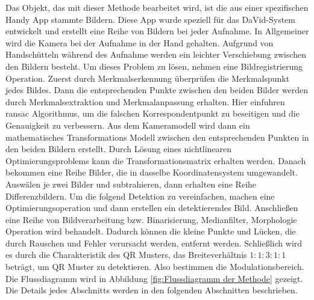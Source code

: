 Das Objekt, das mit dieser Methode bearbeitet wird, ist die aus einer spezifischen Handy App stammte Bildern. Diese App wurde speziell für das DaVid-System entwickelt und erstellt eine Reihe von Bildern bei jeder Aufnahme. In Allgemeiner wird die Kamera bei der Aufnahme in der Hand gehalten. Aufgrund von Handschütteln während des Aufnahme werden ein leichter Verschiebung zwischen den Bildern besteht. Um dieses Problem zu lösen, nehmen eine Bildregistrierung Operation. Zuerst durch Merkmalserkennung überprüfen
die Merkmalspunkt jedes Bildes. Dann die entsprechenden Punkte zwischen den beiden Bilder werden durch Merkmalsextraktion und Merkmalanpassung erhalten. Hier einfuhren \gls{ransac} Algorithmus, um die falschen Korrespondentpunkt zu beseitigen und die Genauigkeit zu verbessern. Aus dem Kameramodell wird dann ein mathematisches Transformations Modell zwischen den entsprechenden Punkten in den beiden Bildern erstellt. Durch Lösung eines nichtlinearen Optimierungsproblems kann die Transformationsmatrix erhalten werden. Danach bekommen eine Reihe Bilder, die in dasselbe Koordinatensystem umgewandelt. Auswälen je zwei Bilder und subtrahieren, dann erhalten eine Reihe Differenzbildern. Um die folgend Detektion zu vereinfachen, machen eine Optimierungsoperation und dann erstellen ein detektierendes Bild. Anschließen eine Reihe von Bildverarbeitung bzw. Binarisierung, Medianfilter, Morphologie Operation wird behandelt. Dadurch können die kleine Punkte und Lücken, die durch Rauschen und Fehler verursacht werden, entfernt werden. Schließlich wird es durch die Charakteristik des QR Musters, das Breiteverhältnis $1:1:3:1:1$ beträgt, um QR Muster zu detektieren. Also bestimmen die Modulationsbereich. Die Flussdiagramm wird in Abbildung \ref{fig:Flussdiagramm der Methode} gezeigt. Die Details jedes Abschnitts werden in den folgenden Abschnitten beschrieben.

